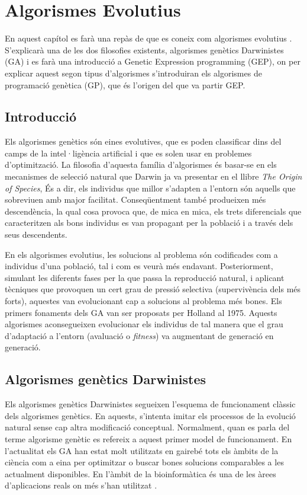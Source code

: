 \documentclass[titlepage,a4paper,12pt]{book}
\begin{document}
\tableofcontents

\chapter{Algorismes Evolutius\label{GA}}

En aquest capítol es farà una repàs de que es coneix com algorismes evolutius
\cite{H75}. S'explicarà una de les dos filosofies existents,
algorismes genètics Darwinistes (GA) i es farà una introducció a Genetic
Expression programming (GEP), on per explicar aquest segon tipus d'algorismes
s'introduiran els algorismes de programació genètica (GP), que és l'origen del
que va partir GEP.

\section{Introducció}
Els algorismes genètics són eines evolutives, que es poden
classificar dins del camps de la intel·ligència artificial i que es solen usar
en problemes d'optimització. La filosofia d'aquesta família d'algorismes és
basar-se en els mecanismes de selecció natural que Darwin ja va presentar en el
llibre \emph{The Origin of Species}, És a dir, els individus que millor
s'adapten a l'entorn són aquells que sobreviuen amb major facilitat.
Conseqüentment també produeixen més descendència, la qual cosa provoca que, de
mica en mica, els trets diferencials que caracteritzen als bons individus es van
propagant per la població i a través dels seus descendents.

En els algorismes evolutius, les solucions al problema són codificades com a
individus d'una població, tal i com es veurà més endavant. Posteriorment,
simulant les diferents fases per la que passa la reproducció natural, i aplicant
tècniques que provoquen un cert grau de pressió selectiva (supervivència dels
més forts), aquestes van evolucionant cap a solucions al problema més bones.
Els primers fonaments dels GA van ser proposats per Holland \cite{H75} al 1975.
Aquests algorismes aconsegueixen evolucionar els individus de tal manera que el
grau d'adaptació a l'entorn (avaluació o \emph{fitness}) va augmentant de
generació en generació.

\section{Algorismes genètics Darwinistes}

Els algorismes genètics Darwinistes segueixen l'esquema de funcionament clàssic
dels algorismes genètics. En aquests, s'intenta imitar els processos de la
evolució natural sense cap altra modificació conceptual. Normalment, quan es
parla del terme algorisme genètic es refereix a aquest primer model de
funcionament. En l'actualitat els GA han estat molt utilitzats en gairebé tots
els àmbits de la ciència com a eina per optimitzar o buscar bones solucions
comparables a les actualment disponibles. En l'àmbit de la bioinformàtica és una
de les àrees d'aplicacions reals on més s'han utilitzat
\cite{PSBE01,D96,wgl:2000,WWBG95}.
\end{document}
